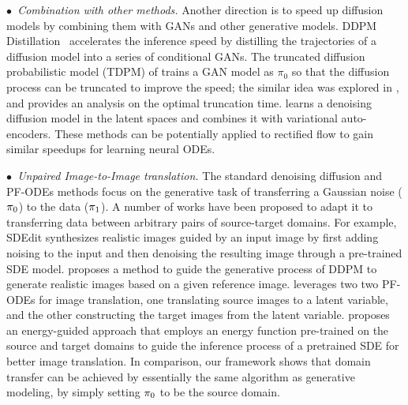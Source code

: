 \emph{$\bullet$~Combination with other methods.}
 Another direction is to speed up diffusion models by combining them with GANs and other generative models. 
DDPM Distillation~\citep{luhman2021knowledge}
accelerates the inference speed 
by distilling the trajectories of a diffusion model into a series of conditional GANs. 
The truncated diffusion probabilistic model (TDPM) of \citep{zheng2022truncated}
trains a GAN model as $\pi_0$ so that the diffusion process can be truncated to improve the speed; 
the similar idea was explored in \cite{lyu2022accelerating, franzese2022much}, 
and \citep{franzese2022much} provides an analysis on the optimal truncation time.  
\citep{sinha2021d2c, wehenkel2021diffusion, vahdat2021score} learns a denoising diffusion model in the latent spaces and combines it with variational auto-encoders. 
These methods can be potentially applied to rectified flow to gain similar speedups for learning neural ODEs.   

\emph{$\bullet$~Unpaired Image-to-Image translation.} 
The standard denoising diffusion and PF-ODEs methods focus on the generative task of transferring a Gaussian noise (${\pi}_0$) to the data (${\pi}_1$). A number of works have been proposed to 
adapt it to transferring data between arbitrary pairs of source-target domains. 
For example, 
SDEdit \cite{meng2021sdedit} 
synthesizes realistic images 
guided by an input image by 
first adding noising to the input and then denoising the resulting image through 
a pre-trained SDE model. 
\cite{choi2021ilvr} proposes 
a method to guide the generative process of DDPM to generate realistic images based on a given reference image.  
\cite{su2022dual} leverages two 
two PF-ODEs for image translation, 
one translating source images to a latent variable, and the other constructing  the target images from the latent variable.  
\cite{zhao2022egsde} proposes 
an energy-guided approach that employs an energy function pre-trained on the source and target domains to guide the inference process of a pretrained SDE for better image translation. 
In comparison, 
our framework shows that domain transfer 
can be achieved by essentially the same algorithm as generative modeling, by simply setting ${\pi}_0$ to be the source domain. %


